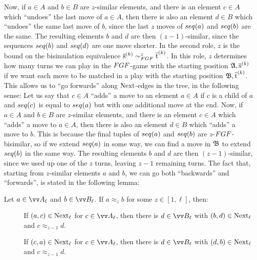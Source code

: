 Now, if $a \in A$ and $b \in B$ are $z$-similar elements, and there is an element $c \in A$ which ``undoes'' the last move of $a \in A$, then there is also an element $d \in B$ which ``undoes'' the same last move of $b$, since the last $z$ moves of $\seq{a}$ and $\seq{b}$ are the same.
The resulting elements $b$ and $d$ are then $(z-1)$-similar, since the sequences $\seq{b}$ and $\seq{d}$ are one move shorter.
In the second role, $z$ is the bound on the bisimulation equivalence $\elemtuples^{(k)} \bisimto_{\FGF}^{z} \elemtuplet^{(k)}$.
In this role, $z$ determines how many turns we can play in the $\FGF$-game with the starting position ${\mathfrak{A}}, \overline{\mathrm{s}}^{(k)}$ if we want each move to be matched in a play with the starting position ${\mathfrak{B}}, \overline{\mathrm{t}}^{(k)}$.
This allows us to ``go forwards'' along $\mathrm{Next}$-edges in the tree, in the following sense:
Let us say that $c \in A$ ``adds'' a move to an element $a \in A$ if $c$ is a child of $a$ and $\seq{c}$ is equal to $\seq{a}$ but with one additional move at the end.
Now, if $a \in A$ and $b \in B$ are $z$-similar elements, and there is an element $c \in A$ which ``adds'' a move to $a \in A$, then there is also an element $d \in B$ which ``adds'' a move to $b$.
This is because the final tuples of $\seq{a}$ and $\seq{b}$ are $z$-$\FGF$-bisimilar, so if we extend $\seq{a}$ in some way, we can find a move in ${\mathfrak{B}}$ to extend $\seq{b}$ in the same way.
The resulting elements $b$ and $d$ are then $(z-1)$-similar, since we used up one of the $z$ turns, leaving $z-1$ remaining turns.
The fact that, starting from $z$-similar elements $a$ and $b$, we can go both ``backwards'' and ``forwards'', is stated in the following lemma:
\begin{lemma}\label{lem:approx-next}
  Let $a \in \unraveldom{A}_{\ell}$ and $b \in \unraveldom{B}_{\ell}$. If $a \approx_{z} b$ for some $z \in [1,\ell]$, then:
  \begin{description}
  \item[] If $(a, c) \in \mathrm{Next}_{\ell}$ for $c \in \unraveldom{A}_{\ell}$, then there is $d \in \unraveldom{B}_{\ell}$ with $(b, d) \in \mathrm{Next}_{\ell}$ and $c \approx_{z-1} d$.
  \item[] If $(c, a) \in \mathrm{Next}_{\ell}$ for $c \in \unraveldom{A}_{\ell}$, then there is $d \in \unraveldom{B}_{\ell}$ with $(d, b) \in \mathrm{Next}_{\ell}$ and $c \approx_{z-1} d$.
\end{description}
\end{lemma}

